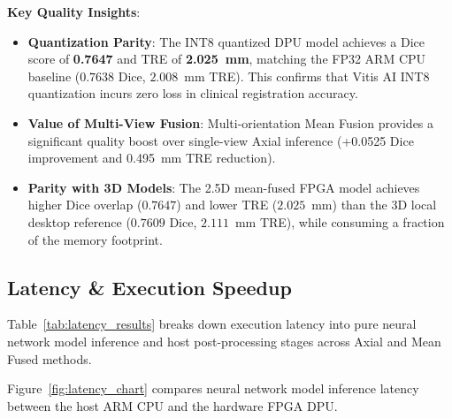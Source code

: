 \documentclass[conference]{IEEEtran}
\begin{document}
\textbf{Key Quality Insights}:
\begin{itemize}
    \item \textbf{Quantization Parity}: The INT8 quantized DPU model achieves a Dice score of \textbf{0.7647} and TRE of \textbf{2.025~mm}, matching the FP32 ARM CPU baseline ($0.7638$ Dice, $2.008$~mm TRE). This confirms that Vitis AI INT8 quantization incurs zero loss in clinical registration accuracy.
    \item \textbf{Value of Multi-View Fusion}: Multi-orientation Mean Fusion provides a significant quality boost over single-view Axial inference (+0.0525 Dice improvement and 0.495~mm TRE reduction).
    \item \textbf{Parity with 3D Models}: The 2.5D mean-fused FPGA model achieves higher Dice overlap ($0.7647$) and lower TRE ($2.025$~mm) than the 3D local desktop reference ($0.7609$ Dice, $2.111$~mm TRE), while consuming a fraction of the memory footprint.
\end{itemize}

\subsection{Latency \& Execution Speedup}
Table~\ref{tab:latency_results} breaks down execution latency into pure neural network model inference and host post-processing stages across Axial and Mean Fused methods.

\begin{table}[htbp]
\caption{Neural Network Model Inference vs Host Processing Breakdown}
\label{tab:latency_results}
\centering
{}
\end{table}

Figure~\ref{fig:latency_chart} compares neural network model inference latency between the host ARM CPU and the hardware FPGA DPU.
\end{document}
